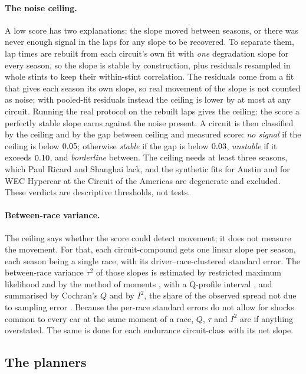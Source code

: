 \documentclass[11pt,a4paper]{article}
\begin{document}
\paragraph{The noise ceiling.} A low score has two explanations: the slope moved
between seasons, or there was never enough signal in the laps for any slope to
be recovered. To separate them, lap times are rebuilt from each circuit's own fit
with \emph{one} degradation slope for every season, so the slope is stable by
construction, plus residuals resampled in whole stints to keep their
within-stint correlation. The residuals come from a fit that gives each season
its own slope, so real movement of the slope is not counted as noise; with
pooled-fit residuals instead the ceiling is lower by at most
\CeilingResidGapMax{} at any circuit. Running the real protocol on the rebuilt
laps gives the ceiling: the score a perfectly stable slope earns against the
noise present. A circuit is then classified by the ceiling and by the gap
between ceiling and measured score: \emph{no signal} if the ceiling is below
$0.05{}$; otherwise \emph{stable} if the gap is below
$0.03{}$, \emph{unstable} if it exceeds $0.10{}$, and
\emph{borderline} between. The ceiling needs at least three seasons, which Paul
Ricard and Shanghai lack, and the synthetic fits for Austin and for WEC
Hypercar at the Circuit of the Americas are degenerate and excluded. These verdicts are descriptive
thresholds, not tests.

\paragraph{Between-race variance.} The ceiling says whether the score could
detect movement; it does not measure the movement. For that, each
circuit-compound gets one linear slope per season, each season being a single
race, with its driver--race-clustered standard error. The between-race variance
$\tau^2$ of those slopes is estimated by restricted maximum likelihood and by
the method of moments \citep{dersimonian1986}, with a Q-profile interval \citep{viechtbauer2007}, and
summarised by Cochran's $Q$ and by $I^2$, the share of the observed spread not
due to sampling error \citep{higgins2002}. Because the per-race standard errors
do not allow for shocks common to every car at the same moment of a race, $Q$,
$\tau$ and $I^2$ are if anything overstated. The same is done for each endurance
circuit-class with its net slope.

\subsection{The planners}
\label{sec:method}
\end{document}
